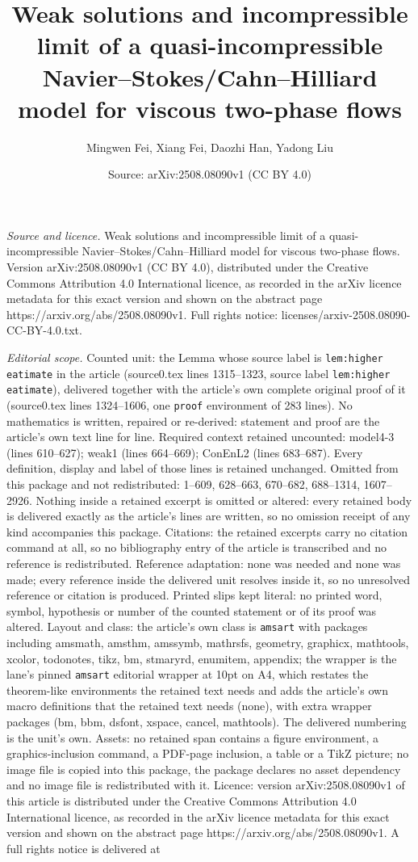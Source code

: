 \documentclass[10pt,a4paper]{amsart}
\title[Weak solutions and incompressible limit of a quasi-incompres]{Weak solutions and incompressible limit of a quasi-incompressible Navier--Stokes/Cahn--Hilliard model for viscous two-phase flows}
\author{Mingwen Fei, Xiang Fei, Daozhi Han, Yadong Liu}
\date{Source: arXiv:2508.08090v1 (CC BY 4.0)}
\begin{document}
\maketitle

\noindent\emph{Source and licence.} Weak solutions and incompressible limit of a quasi-incompressible Navier--Stokes/Cahn--Hilliard model for viscous two-phase flows. Version arXiv:2508.08090v1 (CC BY 4.0), distributed under the Creative Commons Attribution 4.0 International licence, as recorded in the arXiv licence metadata for this exact version and shown on the abstract page https://arxiv.org/abs/2508.08090v1. Full rights notice: licenses/arxiv-2508.08090-CC-BY-4.0.txt.\par\smallskip

\noindent\textit{Editorial scope.} Counted unit: the Lemma whose source label is \texttt{lem:higher eatimate} in the article (source0.tex lines 1315--1323, source label \texttt{lem:higher eatimate}), delivered together with the article's own complete original proof of it (source0.tex lines 1324--1606, one \texttt{proof} environment of 283 lines). No mathematics is written, repaired or re-derived: statement and proof are the article's own text line for line. Required context retained uncounted: model4-3 (lines 610--627); weak1 (lines 664--669); ConEnL2 (lines 683--687). Every definition, display and label of those lines is retained unchanged. Omitted from this package and not redistributed: 1--609, 628--663, 670--682, 688--1314, 1607--2926. Nothing inside a retained excerpt is omitted or altered: every retained body is delivered exactly as the article's lines are written, so no omission receipt of any kind accompanies this package. Citations: the retained excerpts carry no citation command at all, so no bibliography entry of the article is transcribed and no reference is redistributed. Reference adaptation: none was needed and none was made; every reference inside the delivered unit resolves inside it, so no unresolved reference or citation is produced. Printed slips kept literal: no printed word, symbol, hypothesis or number of the counted statement or of its proof was altered. Layout and class: the article's own class is \texttt{amsart} with packages including amsmath, amsthm, amssymb, mathrsfs, geometry, graphicx, mathtools, xcolor, todonotes, tikz, bm, stmaryrd, enumitem, appendix; the wrapper is the lane's pinned \texttt{amsart} editorial wrapper at 10pt on A4, which restates the theorem-like environments the retained text needs and adds the article's own macro definitions that the retained text needs (none), with extra wrapper packages (bm, bbm, dsfont, xspace, cancel, mathtools). The delivered numbering is the unit's own. Assets: no retained span contains a figure environment, a graphics-inclusion command, a PDF-page inclusion, a table or a TikZ picture; no image file is copied into this package, the package declares no asset dependency and no image file is redistributed with it. Licence: version arXiv:2508.08090v1 of this article is distributed under the Creative Commons Attribution 4.0 International licence, as recorded in the arXiv licence metadata for this exact version and shown on the abstract page https://arxiv.org/abs/2508.08090v1. A full rights notice is delivered at 
\end{document}
